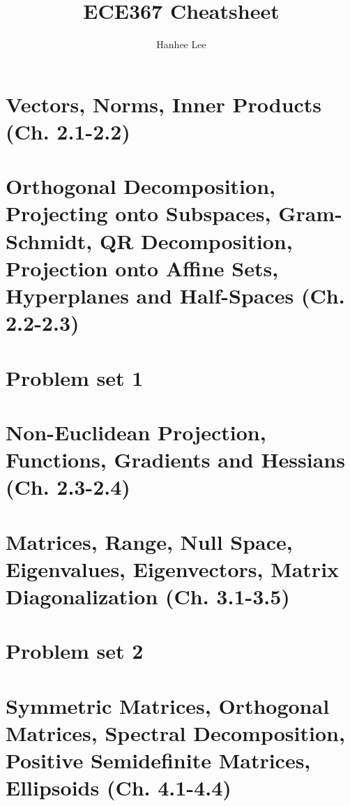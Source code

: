 \documentclass{article}
\title{ECE367 Cheatsheet}
\author{Hanhee Lee}
\begin{document}
\maketitle

\tableofcontents

\listoffigures

\listoftables

\section{Vectors, Norms, Inner Products (Ch. 2.1-2.2)}

\newpage

\section{Orthogonal Decomposition, Projecting onto Subspaces, Gram-Schmidt, QR Decomposition, Projection onto Affine Sets, Hyperplanes and Half-Spaces (Ch. 2.2-2.3)}

\newpage

\section{Problem set 1}

\newpage

\section{Non-Euclidean Projection, Functions, Gradients and Hessians (Ch. 2.3-2.4)}

\newpage

\section{Matrices, Range, Null Space, Eigenvalues, Eigenvectors, Matrix Diagonalization (Ch. 3.1-3.5)}

\newpage

\section{Problem set 2}

\newpage

\section{Symmetric Matrices, Orthogonal Matrices, Spectral Decomposition, Positive Semidefinite Matrices, Ellipsoids (Ch. 4.1-4.4)}

\newpage
\end{document}
